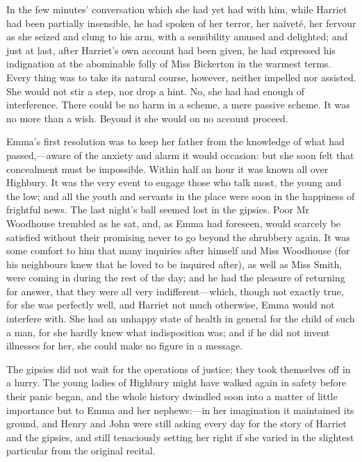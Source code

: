 In the few minutes' conversation which she had yet had with him, while Harriet had been partially insensible, he had spoken of her terror, her naïveté, her fervour as she seized and clung to his arm, with a sensibility amused and delighted; and just at last, after Harriet's own account had been given, he had expressed his indignation at the abominable folly of Miss Bickerton in the warmest terms. Every thing was to take its natural course, however, neither impelled nor assisted. She would not stir a step, nor drop a hint. No, she had had enough of interference. There could be no harm in a scheme, a mere passive scheme. It was no more than a wish. Beyond it she would on no account proceed.

Emma's first resolution was to keep her father from the knowledge of what had passed,—aware of the anxiety and alarm it would occasion: but she soon felt that concealment must be impossible. Within half an hour it was known all over Highbury. It was the very event to engage those who talk most, the young and the low; and all the youth and servants in the place were soon in the happiness of frightful news. The last night's ball seemed lost in the gipsies. Poor Mr Woodhouse trembled as he sat, and, as Emma had foreseen, would scarcely be satisfied without their promising never to go beyond the shrubbery again. It was some comfort to him that many inquiries after himself and Miss Woodhouse (for his neighbours knew that he loved to be inquired after), as well as Miss Smith, were coming in during the rest of the day; and he had the pleasure of returning for answer, that they were all very indifferent—which, though not exactly true, for she was perfectly well, and Harriet not much otherwise, Emma would not interfere with. She had an unhappy state of health in general for the child of such a man, for she hardly knew what indisposition was; and if he did not invent illnesses for her, she could make no figure in a message.

The gipsies did not wait for the operations of justice; they took themselves off in a hurry. The young ladies of Highbury might have walked again in safety before their panic began, and the whole history dwindled soon into a matter of little importance but to Emma and her nephews:—in her imagination it maintained its ground, and Henry and John were still asking every day for the story of Harriet and the gipsies, and still tenaciously setting her right if she varied in the slightest particular from the original recital.